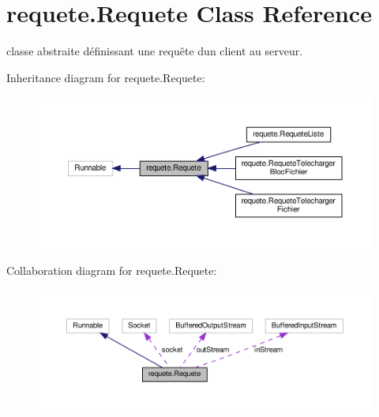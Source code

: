 \hypertarget{classrequete_1_1Requete}{}\section{requete.\+Requete Class Reference}
\label{classrequete_1_1Requete}


classe abstraite définissant une requête d\textquotesingle{}un client au serveur.  




Inheritance diagram for requete.\+Requete\+:
\nopagebreak
\begin{figure}[H]
\begin{center}
\leavevmode
\includegraphics[width=350pt]{classrequete_1_1Requete__inherit__graph}
\end{center}
\end{figure}


Collaboration diagram for requete.\+Requete\+:
\nopagebreak
\begin{figure}[H]
\begin{center}
\leavevmode
\includegraphics[width=350pt]{classrequete_1_1Requete__coll__graph}
\end{center}
\end{figure}
